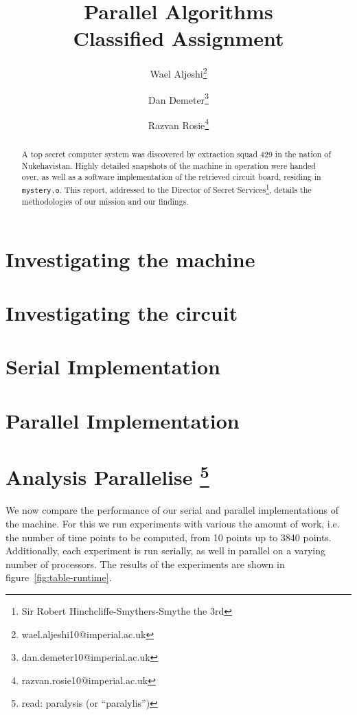 \documentclass[11pt,twocolumn]{article} %
\title{Parallel Algorithms \\ Classified Assignment}
\author{Wael Aljeshi\thanks{wael.aljeshi10@imperial.ac.uk}}
\author{Dan Demeter\thanks{dan.demeter10@imperial.ac.uk}}
\author{Razvan Rosie\thanks{razvan.rosie10@imperial.ac.uk}}
\affil{Department of Computing, Imperial College London}
\begin{document}
\maketitle

\renewcommand{\abstractname}{Mission Brief}

\begin{abstract}
A top secret computer system was discovered by extraction squad 429 in the nation of Nukehavistan. Highly detailed snapshots of the machine in operation were handed over, as well as a software implementation of the retrieved circuit board, residing in \texttt{mystery.o}. This report, addressed to the Director of Secret Services\footnote{Sir Robert Hinchcliffe-Smythers-Smythe the 3rd}, details the methodologies of our mission and our findings.
\end{abstract}



\section{Investigating the machine}


\section{Investigating the circuit}


\section{Serial Implementation}


\section{Parallel Implementation}


\section[Analysis Parallelise]{Analysis Parallelise \footnote{read: paralysis (or ``paralylis'')} }

We now compare the performance of our serial and parallel implementations of the machine. For this we run experiments with various the amount of work, i.e. the number of time points to be computed, from 10 points up to 3840 points. Additionally, each experiment is run serially, as well in parallel on a varying number of processors. The results of the experiments are shown in figure~\ref{fig:table-runtime}.
\end{document}
